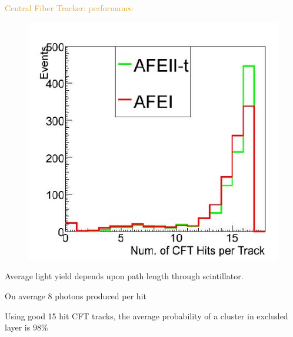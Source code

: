 \begin{frame}{\textcolor{Goldenrod}{Central Fiber Tracker: performance}}
\begin{overlayarea}{\textwidth}{\textheight}
\begin{figure}[h]
      \includegraphics[height=0.2\textheight]{./Images/24_CFT_performance}
    \end{figure}
    \itt[<+->]
  \item Average light yield depends upon path length through
    scintillator.
  \item On average 8 photons produced per hit
  \item Using good 15 hit CFT tracks, the average probability of a
    cluster in excluded layer is $98$\%
    \tti
 \end{overlayarea}
\end{frame}
